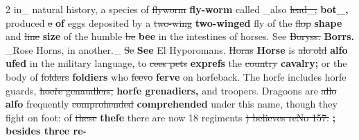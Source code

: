 \documentclass[10pt]{article}
\begin{document}
\begin{multicols}{2}
in\_ natural history, a species of \sout{flyworm} \textbf{fly-worm} called \_also \sout{lead\_,} \textbf{bot\_,} produced \sout{e} \textbf{of} eggs deposited by a \sout{two-wing} \textbf{two-winged} fly of the \sout{flop} \textbf{shape} and \sout{line} \textbf{size} of the humble \sout{be} \textbf{bee} in the intestines of horses. See \sout{Boryss.} \textbf{Borrs.} \_Rose Horns, in another.\_ \sout{Se} \textbf{See} El Hyporomans. \sout{Horas} \textbf{Horse} is \sout{alo old} \textbf{alfo ufed} in the military language, to \sout{cees pets} \textbf{exprefs} the \sout{country} \textbf{cavalry;} or the body of \sout{folders} \textbf{foldiers} who \sout{feevo} \textbf{ferve} on horfeback. The horfe includes horfe guards, \sout{hoeře genaudlers,} \textbf{horfe grenadiers,} and troopers. Dragoons are \sout{allo} \textbf{alfo} frequently \sout{comprohended} \textbf{comprehended} under this name, though they fight on foot: of \sout{these} \textbf{thefe} there are now 18 regiments \sout{) believes reNo 157.} \textbf{; besides three re-}


\end{multicols}
\end{document}
